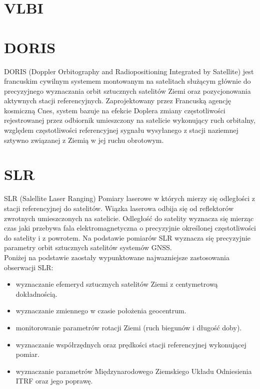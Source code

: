 \section{VLBI}


\section{DORIS}
DORIS (Doppler Orbitography and Radiopositioning Integrated by Satellite) jest francuskim cywilnym systemem montowanym 
na satelitach służącym głównie do precyzyjnego wyznaczania orbit sztucznych satelitów Ziemi oraz pozycjonowania aktywnych stacji referencyjnych.
Zaprojektowany przez Francuską agencję kosmiczną Cnes, system bazuje na efekcie Doplera zmiany częstotliwości rejestrowanej przez odbiornik 
umieszczony na satelicie wykonujący ruch orbitalny, względem częstotliwości referencyjnej sygnału wysyłanego z stacji naziemnej sztywno związanej z Ziemią w jej ruchu obrotowym.


\section{SLR}
\noindent SLR (Salellite Laser Ranging) 
Pomiary laserowe w których mierzy się odległości 
z stacji referencyjnej do satelitów. Wiązka laserowa odbija się od reflektorów zwrotnych umieszczonych 
na satelicie. Odległość do satelity wyznacza się mierząc czas jaki przebywa fala elektromagnetyczna o 
precyzyjnie określonej częstotliwości do satelity i z powrotem. Na podstawie pomiarów SLR wyznacza się precyzyjnie 
parametry orbit sztucznych satelitów systemów GNSS.\\
\indent Poniżej na podstawie \cite[][zakładka: Stacja Laserowa/informacje ogólne]{BOROWIEC} zaostały wypunktowane najwazniejsze zastosowania obserwacji SLR:
\begin{itemize}
\item wyznaczanie efemeryd sztucznych satelitów Ziemi z centymetrową dokładnością.
\item wyznaczanie zmiennego w czasie położenia geocentrum.
\item monitorowanie parametrów rotacji Ziemi (ruch biegunów i długość doby).
\item wyznaczanie współrzędnych oraz prędkości stacji referencyjnej wykonującej pomiar.
\item wyznaczanie parametrów Międzynarodowego Ziemskiego Układu Odniesienia ITRF oraz jego poprawę.
\end{itemize} 
